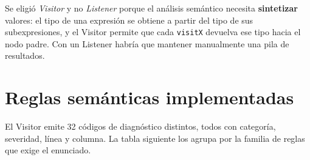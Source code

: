 \documentclass[11pt,a4paper]{article}
\begin{document}
Se eligió \emph{Visitor} y no \emph{Listener} porque el análisis semántico
necesita \textbf{sintetizar} valores: el tipo de una expresión se obtiene a
partir del tipo de sus subexpresiones, y el Visitor permite que cada
\texttt{visitX} devuelva ese tipo hacia el nodo padre. Con un Listener habría
que mantener manualmente una pila de resultados.

\section{Reglas semánticas implementadas}

El Visitor emite 32 códigos de diagnóstico distintos, todos con categoría,
severidad, línea y columna. La tabla siguiente los agrupa por la familia de
reglas que exige el enunciado.
\end{document}
